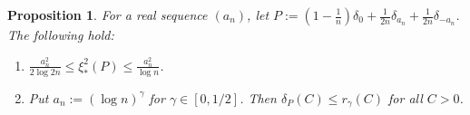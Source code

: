 \documentclass[10pt,a4paper]{amsart}
\newtheorem{proposition}{Proposition}
\begin{document}
\begin{proposition}
    
\label{prop:three-point-computation}
    For a real sequence $(a_n)$, let $P := (1 - \frac1n)\delta_0 + \frac{1}{2n}\delta_{a_n} + \frac{1}{2n} \delta_{-a_n}$. The following hold:
    \begin{enumerate}
        \item[(a)] $\frac{a_n^2}{2\log 2n} \leq \xi_*^2(P) \leq \frac{a_n^2}{\log n}$. 
        \item[(b)] Put $a_n := (\log n)^\gamma$ for $\gamma \in [0, 1/2]$. Then $\delta_P(C) \leq  r_\gamma(C)$ for all $C > 0$.
    \end{enumerate}
\end{proposition}
\end{document}
